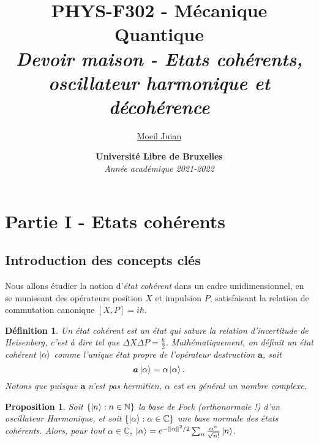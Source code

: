 \documentclass[11pt,oneside,a4paper]{article}
\title{%
  \textbf{PHYS-F302 - Mécanique Quantique} \\
  \textit{Devoir maison - Etats cohérents, oscillateur harmonique et décohérence}
}
\author{%
  \href{mailto:juian.moeil@ulb.be}{Moeil Juian}
}
\date{%
  \textbf{Université Libre de Bruxelles} \\
  \emph{Année académique 2021-2022}
}
\newtheorem{definition}[theorem]{Définition}
\newtheorem{property}[theorem]{Proposition}
\begin{document}
\maketitle
\tableofcontents
\newpage

\section{Partie I - Etats cohérents}
\subsection*{Introduction des concepts clés}
Nous allons étudier la notion d'\emph{état cohérent} dans un cadre unidimensionnel, en se munissant des opérateurs position $X$ et impulsion $P$, satisfaisant la relation de commutation canonique $[X,P] = i\hbar$.

\begin{definition}
    Un état cohérent est un état qui sature la relation d'incertitude de Heisenberg, c'est à dire tel que $\Delta X\Delta P = \frac{\hbar}{2}$. Mathématiquement, on définit un état cohérent $\ket{\alpha}$ comme l'unique état propre de l'opérateur destruction $\bm{a}$, soit
    \begin{equation}
      \label{etat coherent}
        \bm{a}\ket{\alpha} = \alpha\ket{\alpha}.
    \end{equation}
    Notons que puisque $\bm{a}$ n'est pas hermitien, $\alpha$ est en général un nombre complexe. 
\end{definition}

\begin{property}
  \label{coherent in fock}
  Soit $\left\{\ket{n} : n\in\mathbb{N}\right\}$ la base de Fock (orthonormale !) d'un oscillateur Harmonique, et soit $\left\{\ket{\alpha} : \alpha\in\mathbb{C}\right\}$ une base normale des états cohérents. Alors, pour tout $\alpha\in\mathbb{C}$, $\ket{\alpha} = e^{-\norm{\alpha}^2/2}\sum_n \frac{\alpha^n}{\sqrt{n!}}\ket{n}$.
\end{property}
\end{document}
